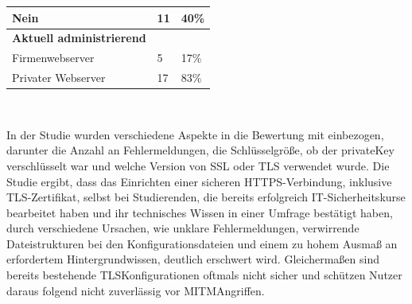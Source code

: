 \begin{table}[H]
{\begin{tabular}{lll}
            Nein                                                      & 11     & 40\%    \\ \hline
            \textbf{Aktuell administrierend}                          &        &         \\
            Firmenwebserver                                           & 5      & 17\%    \\
            Privater Webserver                                        & 17     & 83\%    \\ \hline
        \end{tabular}%
    }
\end{table}\ 

In der Studie wurden verschiedene Aspekte in die Bewertung mit einbezogen, darunter die Anzahl an Fehlermeldungen, die Schlüsselgröße, ob der \gls{privateKey} verschlüsselt war und welche Version von \ac{SSL} oder \ac{TLS} verwendet wurde.
Die Studie ergibt, dass das Einrichten einer sicheren \ac{HTTPS}-Verbindung, inklusive \ac{TLS}-Zertifikat, selbst bei Studierenden, die bereits erfolgreich IT-Sicherheitskurse bearbeitet haben und ihr technisches Wissen in einer Umfrage bestätigt haben, durch verschiedene Ursachen, wie \zb unklare Fehlermeldungen, verwirrende Dateistrukturen bei den Konfigurationsdateien und einem zu hohem Ausmaß an erfordertem Hintergrundwissen, deutlich erschwert wird.\autocite[\vglf][]{usabilityHTTPS:2017} Gleichermaßen sind bereits bestehende \ac{TLS}\nonbreakdash Konfigurationen oftmals nicht sicher und schützen Nutzer daraus folgend nicht zuverlässig vor \ac{MITM}\nonbreakdash Angriffen\autocite[\vglf][]{usabilityHTTPS:2017}.